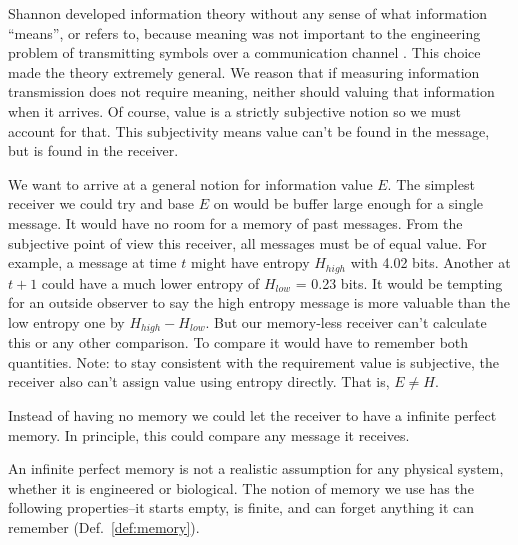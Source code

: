 \documentclass[9pt,twocolumn,twoside]{pnas-new}
\begin{document}
Shannon developed information theory without any sense of what information ``means'', or refers to, because meaning was not important to the engineering problem of transmitting symbols over a communication channel \cite{Shannon1948}. This choice made the theory extremely general. We reason that if measuring information transmission does not require meaning, neither should valuing that information when it arrives. Of course, value is a strictly subjective notion so we must account for that. This subjectivity means value can't be found in the message, but is found in the receiver.


We want to arrive at a general notion for information value $E$. The simplest receiver we could try and base $E$ on would be buffer large enough for a single message. It would have no room for a memory of past messages. From the subjective point of view this receiver, all messages must be of equal value. For example, a message at time $t$ might have entropy $H_{high}$ with 4.02 bits. Another at $t+1$ could have a much lower entropy of $H_{low}$ = 0.23 bits.  It would be tempting for an outside observer to say the high entropy message is more valuable than the low entropy one by $H_{high} - H_{low}$. But our memory-less receiver can't calculate this or any other comparison. To compare it would have to remember both quantities. Note: to stay consistent with the requirement value is subjective, the receiver also can't assign value using entropy directly. That is, $E \neq H$.

Instead of having no memory we could let the receiver to have a infinite perfect memory. In principle, this could compare any message it receives. 

An infinite perfect memory is not a realistic assumption for any physical system, whether it is engineered or biological. The notion of memory we use has the following properties--it starts empty, is finite, and can forget anything it can remember (Def.~\ref{def:memory}). 
\end{document}
